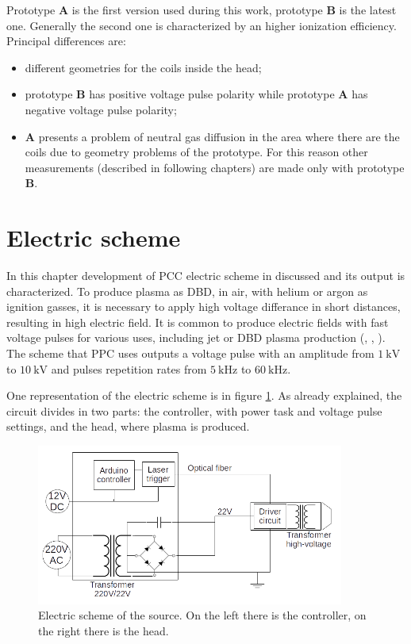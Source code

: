 Prototype \textbf{A} is the first version used during this work, prototype \textbf{B} is the latest one. Generally the second one is characterized by an higher ionization efficiency. Principal differences are:
\begin{itemize}
 \item different geometries for the coils inside the head;
 \item prototype \textbf{B} has positive voltage pulse polarity while prototype \textbf{A} has negative voltage pulse polarity;
 \item \textbf{A} presents a problem of neutral gas diffusion in the area where there are the coils due to geometry problems of the prototype. For this reason other measurements (described in following chapters) are made only with prototype \textbf{B}.
\end{itemize}

\section{Electric scheme}
In this chapter development of PCC electric scheme in discussed and its output is characterized. To produce plasma as DBD, in air, with helium or argon as ignition gasses, it is necessary to apply high voltage differance in short distances, resulting in high electric field.
It is common to produce electric fields with fast voltage pulses for various uses, including jet or DBD plasma production (\cite{Upadhyay:hvpulse}, \cite{Jarrige:plumecharacteristics}, \cite{Darny:jetplume}). The scheme that PPC uses outputs a voltage pulse with an amplitude from $\SI{1}{\kilo\volt}$ to $\SI{10}{\kilo\volt}$ and pulses repetition rates from $\SI{5}{\kilo\hertz}$ to $\SI{60}{\kilo\hertz}$.

One representation of the electric scheme is in figure \ref{fig:electricline}. As already explained, the circuit divides in two parts: the controller, with power task and voltage pulse settings, and the head, where plasma is produced.
\begin{figure}
 \centering
 \includegraphics[width=0.9\textwidth]{Images/Electric/Linea_elettrica2.png}
 \caption{Electric scheme of the source. On the left there is the controller, on the right there is the head.}
 \label{fig:electricline}
\end{figure}

